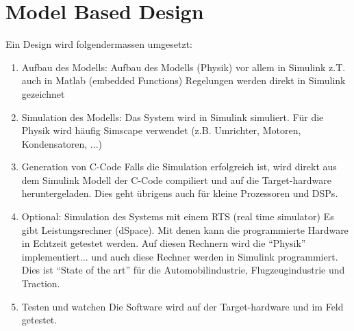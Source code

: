 \section{Model Based Design}
Ein Design wird folgendermassen umgesetzt:
\begin{enumerate}
\item {\color{magenta}Aufbau des Modells:}
Aufbau des Modells (Physik) vor allem in Simulink z.T. auch in Matlab (embedded Functions)
Regelungen werden direkt in Simulink gezeichnet
\item {\color{magenta}Simulation des Modells:}
Das System wird in Simulink simuliert.
Für die Physik wird häufig Simscape verwendet (z.B. Umrichter, Motoren, Kondensatoren, ...)
\item {\color{magenta}Generation von C-Code}
Falls die Simulation erfolgreich ist, wird direkt aus dem Simulink Modell der C-Code compiliert und auf die Target-hardware heruntergeladen.
Dies geht übrigens auch für kleine Prozessoren und DSPs.
\item {\color{magenta}Optional: Simulation des Systems mit einem RTS (real time simulator)}
Es gibt Leistungsrechner  (dSpace). Mit denen kann die programmierte Hardware in Echtzeit getestet werden.
Auf diesen Rechnern wird die ``Physik'' implementiert... und auch diese Rechner werden in Simulink programmiert.
Dies ist ``State of the art'' für die Automobilindustrie, Flugzeugindustrie und Traction.
\item {\color{magenta}Testen und watchen}
Die Software wird auf der Target-hardware und im Feld getestet.
\end{enumerate}







